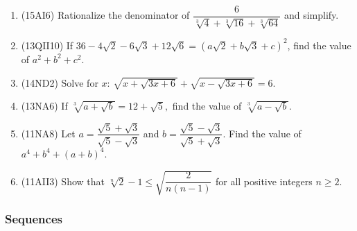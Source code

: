 \documentclass[10pt,paper=letter]{scrartcl}
\begin{document}
\begin{enumerate}

\item (15AI6) Rationalize the denominator of $\dfrac{6}{\sqrt[3]{4} + \sqrt[3]{16} + \sqrt[3]{64}}$ and simplify.

\item (13QII10) If $36 - 4\sqrt{2} - 6\sqrt{3} + 12\sqrt{6} = (a\sqrt{2} + b\sqrt{3} + c)^2$, find the value of $a^2 + b^2 + c^2$.

\item (14ND2) Solve for $x$: $\sqrt{x+\sqrt{3x+6}} + \sqrt{x-\sqrt{3x+6}} = 6$.

\item (13NA6) If $\sqrt[3]{a+\sqrt{b}} = 12 + \sqrt{5},$ find the value of $\sqrt[3]{a-\sqrt{b}}$.

\item (11NA8) Let $a = \dfrac{\sqrt{5} + \sqrt{3}}{\sqrt{5} - \sqrt{3}}$ and $b = \dfrac{\sqrt{5} - \sqrt{3}}{\sqrt{5} + \sqrt{3}}$. Find the value of $a^4 + b^4 + (a + b)^4$.

\item (11AII3) Show that $\sqrt[n]{2} - 1 \leq \sqrt{\dfrac{2}{n(n-1)}}$ for all positive integers $n \geq 2$.

\end{enumerate}

\subsubsection*{Sequences}
\end{document}
